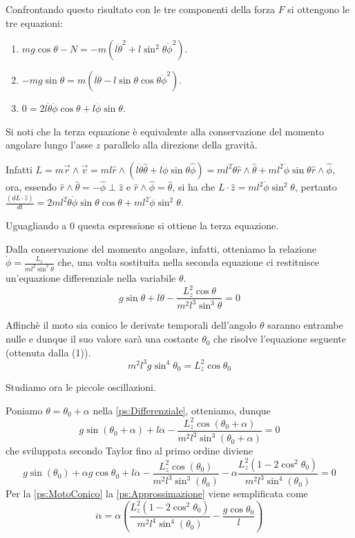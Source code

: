 \documentclass[../main.tex]{subfiles}
\begin{document}
Confrontando questo risultato con le tre componenti della forza $F$ si ottengono le tre equazioni:
\begin{enumerate}
 \item $mg\cos\theta -N=-m(l\dot{\theta}^2+l\sin^2\theta\dot{\phi}^2)$.
 \item $-mg\sin\theta=m(l\ddot{\theta}-l\sin\theta\cos\theta\dot{\phi}^2)$.
 \item $0=2l\dot{\theta}\dot{\phi}\cos\theta+l\ddot{\phi}\sin\theta$.
\end{enumerate}
Si noti che la terza equazione \`e equivalente alla conservazione del momento angolare lungo l'asse $z$ parallelo alla direzione della gravit\`a.

Infatti $L=m\vec{r}\wedge\vec{v}=ml\hat{r}\wedge(l\dot{\theta}\hat{\theta}+l\dot{\phi}\sin\theta\hat{\phi})=ml^2\dot{\theta}\hat{r}\wedge\hat{\theta}+ml^2\dot{\phi}\sin\theta\hat{r}\wedge\hat{\phi}$, ora, essendo $\hat{r}\wedge\hat{\theta}=-\hat{\phi}\perp\hat{z}$ e $\hat{r}\wedge\hat{\phi}=\hat{\theta}$, si ha che
$L\cdot\hat{z}=ml^2\dot{\phi}\sin^2\theta$, pertanto $\displaystyle \frac{(dL\cdot\hat{z})}{dt}=2ml^2\dot{\theta}\dot{\phi}\sin\theta\cos\theta+ml^2\ddot{\phi}\sin^2\theta$.

Uguagliando a 0 questa espressione si ottiene la terza equazione.

Dalla conservazione del momento angolare, infatti, otteniamo la relazione $\displaystyle \dot{\phi}=\frac{L_z}{ml^2\sin^2\theta}$ che, una volta sostituita nella seconda equazione ci restituisce un'equazione differenziale nella variabile $\theta$.
\begin{equation}\label{ps:Differenziale}
g\sin\theta+l\ddot{\theta}-\frac{L_z^2\cos\theta}{m^2l^3\sin^3\theta}=0
\end{equation}

Affinch\`e il moto sia conico le derivate temporali dell'angolo $\theta$ saranno entrambe nulle e dunque il suo valore sar\`a una costante $\theta_0$ che risolve l'equazione seguente (ottenuta dalla (1)).
\begin{equation}\label{ps:MotoConico}
m^2l^3g\sin^4\theta_0=L_z^2\cos\theta_0
\end{equation}

Studiamo ora le piccole oscillazioni.

Poniamo $\theta=\theta_0+\alpha$ nella \cref{ps:Differenziale}, otteniamo, dunque
$$ g\sin(\theta_0+\alpha)+l\ddot{\alpha}-\frac{L_z^2\cos(\theta_0+\alpha)}{m^2l^3\sin^3(\theta_0+\alpha)}=0 $$
che sviluppata secondo Taylor fino al primo ordine diviene
\begin{equation}\label{ps:Approssimazione}
g\sin(\theta_0)+\alpha g\cos\theta_0+l\ddot{\alpha}-\frac{L_z^2\cos(\theta_0)}{m^2l^3\sin^3(\theta_0)}-\alpha\frac{L_z^2(1-2\cos^2\theta_0)}{m^2l^3\sin^4(\theta_0)}=0
\end{equation}
Per la \cref{ps:MotoConico} la \cref{ps:Approssimazione} viene semplificata come
\begin{equation}
\ddot{\alpha}=\alpha\left({\frac{L_z^2(1-2\cos^2\theta_0)}{m^2l^4\sin^4(\theta_0)}-\frac{g\cos\theta_0}{l}}\right)
\end{equation}
\end{document}
